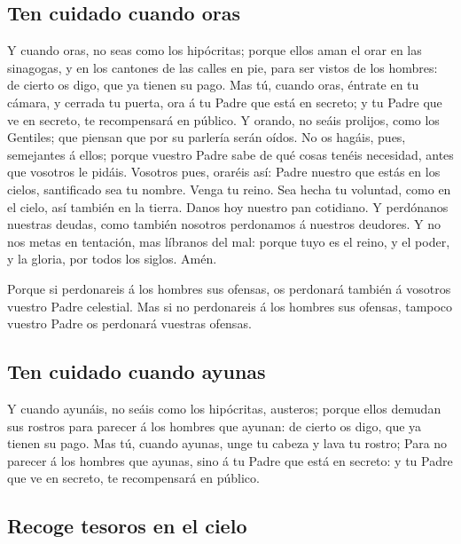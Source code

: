 \hypertarget{ten-cuidado-cuando-oras}{%
\subsection{Ten cuidado cuando oras}\label{ten-cuidado-cuando-oras}}

 Y cuando oras, no seas como los hipócritas; porque ellos
aman el orar en las sinagogas, y en los cantones de las calles en pie,
para ser vistos de los hombres: de cierto os digo, que ya tienen su
pago.  Mas tú, cuando oras, éntrate en tu cámara, y cerrada
tu puerta, ora á tu Padre que está en secreto; y tu Padre que ve en
secreto, te recompensará en público.  Y orando, no seáis
prolijos, como los Gentiles; que piensan que por su parlería serán
oídos.  No os hagáis, pues, semejantes á ellos; porque
vuestro Padre sabe de qué cosas tenéis necesidad, antes que vosotros le
pidáis.  Vosotros pues, oraréis así: Padre nuestro que estás
en los cielos, santificado sea tu nombre.  Venga tu reino.
Sea hecha tu voluntad, como en el cielo, así también en la tierra.
 Danos hoy nuestro pan cotidiano.  Y
perdónanos nuestras deudas, como también nosotros perdonamos á nuestros
deudores.  Y no nos metas en tentación, mas líbranos del
mal: porque tuyo es el reino, y el poder, y la gloria, por todos los
siglos. Amén.

 Porque si perdonareis á los hombres sus ofensas, os
perdonará también á vosotros vuestro Padre celestial.  Mas
si no perdonareis á los hombres sus ofensas, tampoco vuestro Padre os
perdonará vuestras ofensas.

\hypertarget{ten-cuidado-cuando-ayunas}{%
\subsection{Ten cuidado cuando ayunas}\label{ten-cuidado-cuando-ayunas}}

 Y cuando ayunáis, no seáis como los hipócritas, austeros;
porque ellos demudan sus rostros para parecer á los hombres que ayunan:
de cierto os digo, que ya tienen su pago.  Mas tú, cuando
ayunas, unge tu cabeza y lava tu rostro;  Para no parecer á
los hombres que ayunas, sino á tu Padre que está en secreto: y tu Padre
que ve en secreto, te recompensará en público.

\hypertarget{recoge-tesoros-en-el-cielo}{%
\subsection{Recoge tesoros en el
cielo}\label{recoge-tesoros-en-el-cielo}}

